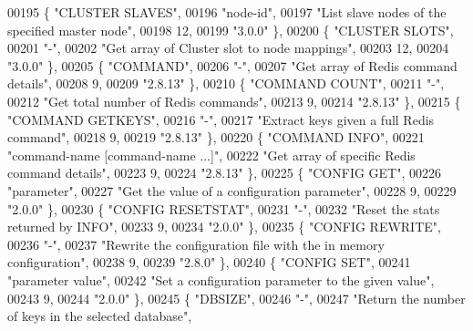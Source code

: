 \begin{DoxyCode}
00195     \{ \textcolor{stringliteral}{"CLUSTER SLAVES"},
00196     \textcolor{stringliteral}{"node-id"},
00197     \textcolor{stringliteral}{"List slave nodes of the specified master node"},
00198     12,
00199     \textcolor{stringliteral}{"3.0.0"} \},
00200     \{ \textcolor{stringliteral}{"CLUSTER SLOTS"},
00201     \textcolor{stringliteral}{"-"},
00202     \textcolor{stringliteral}{"Get array of Cluster slot to node mappings"},
00203     12,
00204     \textcolor{stringliteral}{"3.0.0"} \},
00205     \{ \textcolor{stringliteral}{"COMMAND"},
00206     \textcolor{stringliteral}{"-"},
00207     \textcolor{stringliteral}{"Get array of Redis command details"},
00208     9,
00209     \textcolor{stringliteral}{"2.8.13"} \},
00210     \{ \textcolor{stringliteral}{"COMMAND COUNT"},
00211     \textcolor{stringliteral}{"-"},
00212     \textcolor{stringliteral}{"Get total number of Redis commands"},
00213     9,
00214     \textcolor{stringliteral}{"2.8.13"} \},
00215     \{ \textcolor{stringliteral}{"COMMAND GETKEYS"},
00216     \textcolor{stringliteral}{"-"},
00217     \textcolor{stringliteral}{"Extract keys given a full Redis command"},
00218     9,
00219     \textcolor{stringliteral}{"2.8.13"} \},
00220     \{ \textcolor{stringliteral}{"COMMAND INFO"},
00221     \textcolor{stringliteral}{"command-name [command-name ...]"},
00222     \textcolor{stringliteral}{"Get array of specific Redis command details"},
00223     9,
00224     \textcolor{stringliteral}{"2.8.13"} \},
00225     \{ \textcolor{stringliteral}{"CONFIG GET"},
00226     \textcolor{stringliteral}{"parameter"},
00227     \textcolor{stringliteral}{"Get the value of a configuration parameter"},
00228     9,
00229     \textcolor{stringliteral}{"2.0.0"} \},
00230     \{ \textcolor{stringliteral}{"CONFIG RESETSTAT"},
00231     \textcolor{stringliteral}{"-"},
00232     \textcolor{stringliteral}{"Reset the stats returned by INFO"},
00233     9,
00234     \textcolor{stringliteral}{"2.0.0"} \},
00235     \{ \textcolor{stringliteral}{"CONFIG REWRITE"},
00236     \textcolor{stringliteral}{"-"},
00237     \textcolor{stringliteral}{"Rewrite the configuration file with the in memory configuration"},
00238     9,
00239     \textcolor{stringliteral}{"2.8.0"} \},
00240     \{ \textcolor{stringliteral}{"CONFIG SET"},
00241     \textcolor{stringliteral}{"parameter value"},
00242     \textcolor{stringliteral}{"Set a configuration parameter to the given value"},
00243     9,
00244     \textcolor{stringliteral}{"2.0.0"} \},
00245     \{ \textcolor{stringliteral}{"DBSIZE"},
00246     \textcolor{stringliteral}{"-"},
00247     \textcolor{stringliteral}{"Return the number of keys in the selected database"},

\end{DoxyCode}
